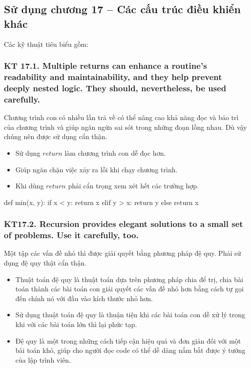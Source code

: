 \documentclass[12pt]{report}
\begin{document}
\subsection{Sử dụng chương 17 – Các cấu trúc điều khiển khác}
\noindent Các kỹ thuật tiêu biểu gồm: 

\subsubsection{KT 17.1. Multiple returns can enhance a routine's readability and maintainability, and they help prevent deeply nested logic. They should, nevertheless, be used carefully.}
Chương trình con có nhiều lần trả về có thể nâng cao khả năng đọc và bảo trì của chương trình và giúp ngăn ngừa sai sót trong những đoạn lồng nhau. Dù vậy chúng nên được sử dụng cẩn thận.
\begin{itemize}
	\item Sử dụng $return$ làm chương trình con dễ đọc hơn.
	\item Giúp ngăn chặn việc xảy ra lỗi khi chạy chương trình.
	\item Khi dùng $return$ phải cẩn trọng xem xét hết các trường hợp.
	
\end{itemize}
\begin{python}
def min(x, y):
	if x < y:
		return x
	elif y > x: 
		return y
	else
		return x
\end{python}

\subsubsection{KT17.2. Recursion provides elegant solutions to a small set of problems. Use it carefully, too.}
Một tập các vấn đề nhỏ thì được giải quyết bằng phương pháp đệ quy. Phải sử dụng đệ quy thật cẩn thận.
\begin{itemize}
	\item Thuật toán đệ quy là thuật toán dựa trên phương pháp chia để trị, chia bài toán thành các bài toán con giải quyết các vấn đề nhỏ hơn bằng cách tự gọi đến chính nó với đầu vào kích thước nhỏ hơn.
	\item Sử dụng thuật toán đệ quy là thuận tiện khi các bài toán con dễ xử lý trong khi với các bài toán lớn thì lại phức tạp.
	\item Đệ quy là một trong những cách tiếp cận hiệu quả và đơn giản đối với một bài toán khó, giúp cho người đọc code có thể dễ dàng nắm bắt được ý tưởng của lập trình viên.
\end{itemize}
\end{document}
